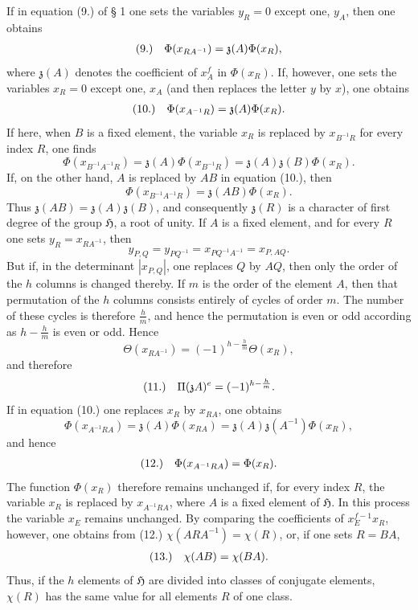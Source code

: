 \documentclass[11pt]{article}
\makeatletter
\newcommand{\Hgrp}{\mathfrak{H}}
\newcommand{\zchar}{\mathfrak{z}}
\newcommand{\frobtagc}[2]{\[\begin{array}{@{}r@{\quad}c@{}}\textup{(#1)} & \displaystyle #2\end{array}\]}
\makeatother
\begin{document}
If in equation (9.) of § 1 one sets the variables $y_R=0$ except one, $y_A$, then one obtains
\frobtagc{9.}{\Phi(x_{RA^{-1}})=\zchar(A)\Phi(x_R),}
where $\zchar(A)$ denotes the coefficient of $x_A^f$ in $\Phi(x_R)$. If, however, one sets the variables $x_R=0$ except one, $x_A$ (and then replaces the letter $y$ by $x$), one obtains
\frobtagc{10.}{\Phi(x_{A^{-1}R})=\zchar(A)\Phi(x_R).}
If here, when $B$ is a fixed element, the variable $x_R$ is replaced by $x_{B^{-1}R}$ for every index $R$, one finds
\[
\Phi(x_{B^{-1}A^{-1}R})=\zchar(A)\Phi(x_{B^{-1}R})=\zchar(A)\zchar(B)\Phi(x_R).
\]
If, on the other hand, $A$ is replaced by $AB$ in equation (10.), then
\[
\Phi(x_{B^{-1}A^{-1}R})=\zchar(AB)\Phi(x_R).
\]
Thus $\zchar(AB)=\zchar(A)\zchar(B)$, and consequently $\zchar(R)$ is a character of first degree of the group $\Hgrp$, a root of unity. If $A$ is a fixed element, and for every $R$ one sets $y_R=x_{RA^{-1}}$, then
\[
y_{P,Q}=y_{PQ^{-1}}=x_{PQ^{-1}A^{-1}}=x_{P,AQ}.
\]
But if, in the determinant $|x_{P,Q}|$, one replaces $Q$ by $AQ$, then only the order of the $h$ columns is changed thereby. If $m$ is the order of the element $A$, then that permutation of the $h$ columns consists entirely of cycles of order $m$. The number of these cycles is therefore $\frac{h}{m}$, and hence the permutation is even or odd according as $h-\frac{h}{m}$ is even or odd. Hence
\[
\Theta(x_{RA^{-1}})=(-1)^{h-\frac{h}{m}}\Theta(x_R),
\]
and therefore
\frobtagc{11.}{\Pi(\zchar A)^e=(-1)^{h-\frac{h}{m}}.}
If in equation (10.) one replaces $x_R$ by $x_{RA}$, one obtains
\[
\Phi(x_{A^{-1}RA})=\zchar(A)\Phi(x_{RA})=\zchar(A)\zchar(A^{-1})\Phi(x_R),
\]
and hence
\frobtagc{12.}{\Phi(x_{A^{-1}RA})=\Phi(x_R).}
The function $\Phi(x_R)$ therefore remains unchanged if, for every index $R$, the variable $x_R$ is replaced by $x_{A^{-1}RA}$, where $A$ is a fixed element of $\Hgrp$. In this process the variable $x_E$ remains unchanged. By comparing the coefficients of $x_E^{f-1}x_R$, however, one obtains from (12.) $\chi(ARA^{-1})=\chi(R)$, or, if one sets $R=BA$,
\frobtagc{13.}{\chi(AB)=\chi(BA).}
Thus, if the $h$ elements of $\Hgrp$ are divided into classes of conjugate elements, $\chi(R)$ has the same value for all elements $R$ of one class.
\end{document}
